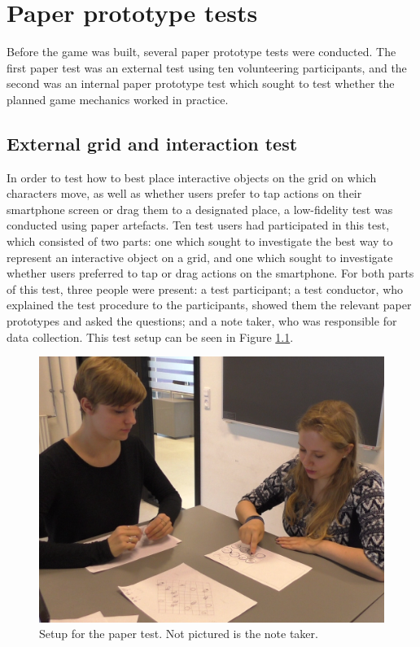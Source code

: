 \chapter{Paper prototype tests}\label{ch:paperPlaytest}
Before the game was built, several paper prototype tests were conducted. The first paper test was an external test using ten volunteering participants, and the second was an internal paper prototype test which sought to test whether the planned game mechanics worked in practice.

\section{External grid and interaction test}
In order to test how to best place interactive objects on the grid on which characters move, as well as whether users prefer to tap actions on their smartphone screen or drag them to a designated place, a low-fidelity test was conducted using paper artefacts. Ten test users had participated in this test, which consisted of two parts: one which sought to investigate the best way to represent an interactive object on a grid, and one which sought to investigate whether users preferred to tap or drag actions on the smartphone. For both parts of this test, three people were present: a test participant; a test conductor, who explained the test procedure to the participants, showed them the relevant paper prototypes and asked the questions; and a note taker, who was responsible for data collection. This test setup can be seen in Figure \ref{fig:papersetup}.

\begin{figure}[h!]
	\centering
	\includegraphics[width=\textwidth / 2]{figures/PaperTestSetup.png}
	\caption{Setup for the paper test. Not pictured is the note taker. \label{fig:papersetup}}
\end{figure}

